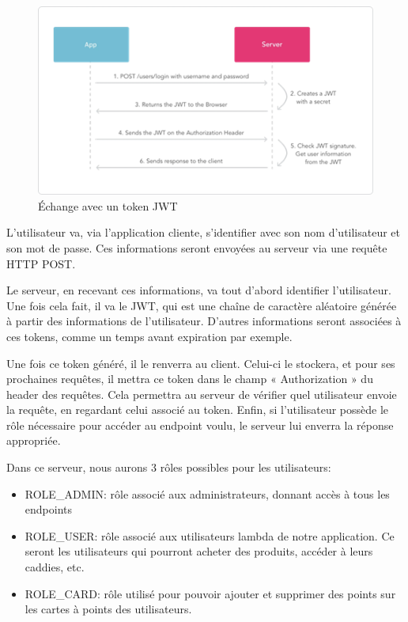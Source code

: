 \begin{figure}[H]
    \centering
    \includegraphics[width=\textwidth]{./img/joey-img-1.png}
    \caption{Échange avec un token JWT}
    \label{fig:poc-jwt-exchange}
\end{figure}

L'utilisateur va, via l'application cliente, s'identifier avec son nom d'utilisateur et son mot de passe. Ces
informations seront envoyées au serveur via une requête HTTP POST.

Le serveur, en recevant ces informations, va tout d'abord identifier l'utilisateur. Une fois cela fait, il va le
JWT, qui est une chaîne de caractère aléatoire générée à partir des informations de l'utilisateur. D'autres
informations seront associées à ces tokens, comme un temps avant expiration par exemple.

Une fois ce token généré, il le renverra au client. Celui-ci le stockera, et pour ses prochaines requêtes, il
mettra ce token dans le champ « Authorization » du header des requêtes. Cela permettra au serveur de
vérifier quel utilisateur envoie la requête, en regardant celui associé au token. Enfin, si l'utilisateur
possède le rôle nécessaire pour accéder au endpoint voulu, le serveur lui enverra la réponse appropriée.

Dans ce serveur, nous aurons 3 rôles possibles pour les utilisateurs:

\begin{itemize}
    \item ROLE\_ADMIN: rôle associé aux administrateurs, donnant accès à tous les endpoints
    \item ROLE\_USER: rôle associé aux utilisateurs lambda de notre application. Ce seront les utilisateurs qui pourront acheter des produits, accéder à leurs caddies, etc.
    \item ROLE\_CARD: rôle utilisé pour pouvoir ajouter et supprimer des points sur les cartes à points des utilisateurs.
\end{itemize}

